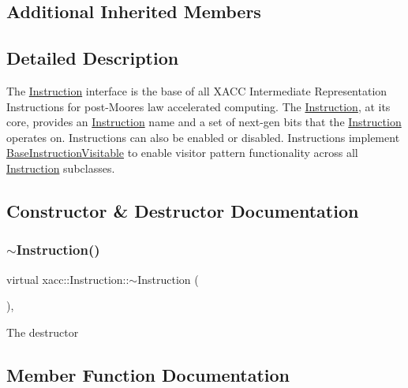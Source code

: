 \subsection*{Additional Inherited Members}


\subsection{Detailed Description}
The \hyperlink{a02460}{Instruction} interface is the base of all X\+A\+CC Intermediate Representation Instructions for post-\/\+Moore\textquotesingle{}s law accelerated computing. The \hyperlink{a02460}{Instruction}, at its core, provides an \hyperlink{a02460}{Instruction} name and a set of next-\/gen bits that the \hyperlink{a02460}{Instruction} operates on. Instructions can also be enabled or disabled. Instructions implement \hyperlink{a02476}{Base\+Instruction\+Visitable} to enable visitor pattern functionality across all \hyperlink{a02460}{Instruction} subclasses. 

\subsection{Constructor \& Destructor Documentation}
\mbox{\label{a02460_ae22c935e8113bce63d1d0e214cda4d61}} 
\subsubsection{\texorpdfstring{$\sim$\+Instruction()}{~Instruction()}}
{\footnotesize\ttfamily virtual xacc\+::\+Instruction\+::$\sim$\+Instruction (\begin{DoxyParamCaption}{ }\end{DoxyParamCaption})\hspace{0.3cm}{\ttfamily [inline]}, {\ttfamily [virtual]}}

The destructor 

\subsection{Member Function Documentation}
\mbox{\label{a02460_a819f32e94c3e1c9e69a0061aaf8d86dc}} 

